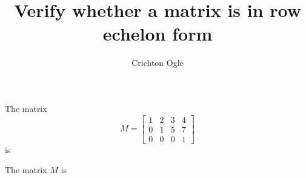 \documentclass{ximera}
\title{Verify whether a matrix is in row echelon form}
\author{Crichton Ogle}
\begin{document}
\begin{question} The matrix
  \[M = \begin{bmatrix}
1 & 2 & 3 & 4\\
0 & 1 & 5 & 7\\
0 & 0 & 0 & 1
\end{bmatrix}\]
is
\begin{multipleChoice}
\end{multipleChoice}

\begin{question}
  The matrix $M$ is
  \begin{multipleChoice}
  \end{multipleChoice}
\end{question}
\end{question}
\end{document}
